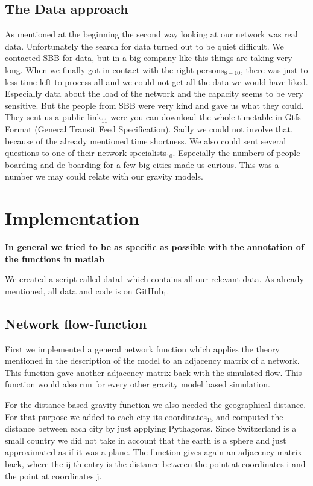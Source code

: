 \documentclass[11pt]{article}
\begin{document}
\subsection{The Data approach}

As mentioned at the beginning the second way looking at our network was real data. Unfortunately the search for data turned out to be quiet difficult. We contacted SBB for data, but in a big company like this things are taking very long. When we finally got in contact with the right persons$_{8-10}$, there was just to less time left to process all and we could not get all the data we would have liked. Especially data about the load of the network and the capacity seems to be very sensitive. But the people from SBB were very kind and gave us what they could. They sent us a public link$_{11}$ were you can download the whole timetable in Gtfs-Format (General Transit Feed Specification). Sadly we could not involve that, because of the already mentioned time shortness. We also could sent several questions to one of their network specialists$_{10}$. Especially the numbers of people boarding and de-boarding for a few big cities made us curious. This was a number we may could relate with our gravity models.  


\section{Implementation}
\textbf{In general we tried to be as specific as possible with the annotation of the functions in matlab}

We created a script called data1 which contains all our relevant data. As already mentioned, all data and code is on GitHub$_1$.

\subsection{Network flow-function}
First we implemented a general network function which applies the theory mentioned in the description of the model to an adjacency matrix of a network. This function gave another adjacency matrix back with the simulated flow. This function would also run for every other gravity model based simulation.\newline

For the distance based gravity function we also needed the geographical distance. For that purpose we added to each city its coordinates$_{15}$ and computed the distance between each city by just applying Pythagoras. Since Switzerland is a small country we did not take in account that the earth is a sphere and just approximated as if it was a plane. The function gives again an adjacency matrix back, where the ij-th entry is the distance between the point at coordinates i and the point at coordinates j.
\end{document}
